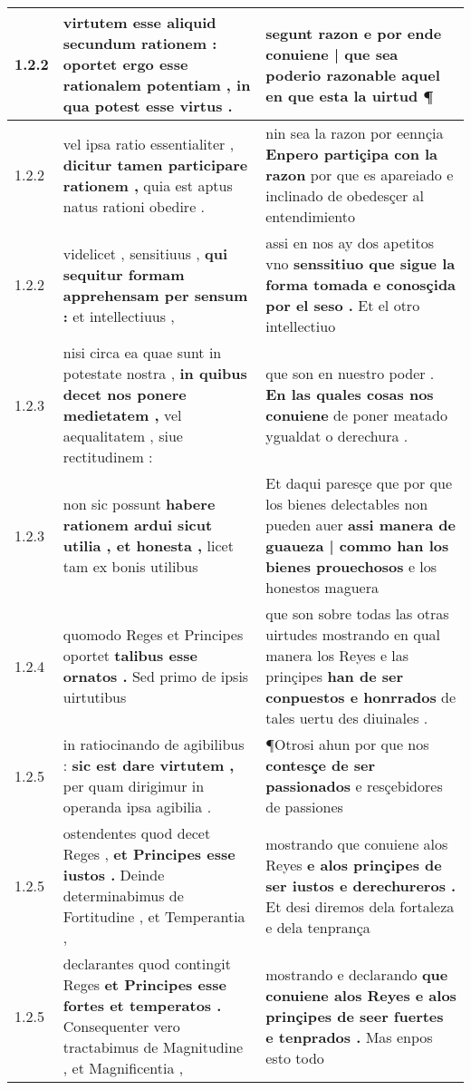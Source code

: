 \begin{tabular}{|p{1cm}|p{6.5cm}|p{6.5cm}|}
1.2.2 & virtutem esse aliquid secundum rationem : \textbf{ oportet ergo esse rationalem potentiam , } in qua potest esse virtus . & segunt razon \textbf{ e por ende conuiene | que sea poderio razonable } aquel en que esta la uirtud ¶ \\\hline
1.2.2 & vel ipsa ratio essentialiter , \textbf{ dicitur tamen participare rationem , } quia est aptus natus rationi obedire . & nin sea la razon por eennçia \textbf{ Enpero partiçipa con la razon } por que es apareiado e inclinado de obedesçer al entendimiento \\\hline
1.2.2 & videlicet , sensitiuus , \textbf{ qui sequitur formam apprehensam per sensum : } et intellectiuus , & assi en nos ay dos apetitos vno \textbf{ senssitiuo que sigue la forma tomada e conosçida por el seso . } Et el otro intellectiuo \\\hline
1.2.3 & nisi circa ea quae sunt in potestate nostra , \textbf{ in quibus decet nos ponere medietatem , } vel aequalitatem , siue rectitudinem : & que son en nuestro poder . \textbf{ En las quales cosas nos conuiene } de poner meatado ygualdat o derechura . \\\hline
1.2.3 & non sic possunt \textbf{ habere rationem ardui sicut utilia , et honesta , } licet tam ex bonis utilibus & Et daqui paresçe que por que los bienes delectables non pueden auer \textbf{ assi manera de guaueza | commo han los bienes prouechosos } e los honestos maguera \\\hline
1.2.4 & quomodo Reges et Principes oportet \textbf{ talibus esse ornatos . } Sed primo de ipsis uirtutibus & que son sobre todas las otras uirtudes mostrando en qual manera los Reyes e las prinçipes \textbf{ han de ser conpuestos e honrrados } de tales uertu des diuinales . \\\hline
1.2.5 & in ratiocinando de agibilibus : \textbf{ sic est dare virtutem , } per quam dirigimur in operanda ipsa agibilia . & ¶Otrosi ahun por que nos \textbf{ contesçe de ser passionados } e resçebidores de passiones \\\hline
1.2.5 & ostendentes quod decet Reges , \textbf{ et Principes esse iustos . } Deinde determinabimus de Fortitudine , et Temperantia , & mostrando que conuiene alos Reyes \textbf{ e alos prinçipes de ser iustos e derechureros . } Et desi diremos dela fortaleza e dela tenprança \\\hline
1.2.5 & declarantes quod contingit Reges \textbf{ et Principes esse fortes et temperatos . } Consequenter vero tractabimus de Magnitudine , et Magnificentia , & mostrando e declarando \textbf{ que conuiene alos Reyes e alos prinçipes de seer fuertes e tenprados . } Mas enpos esto todo \\\hline

\end{tabular}
